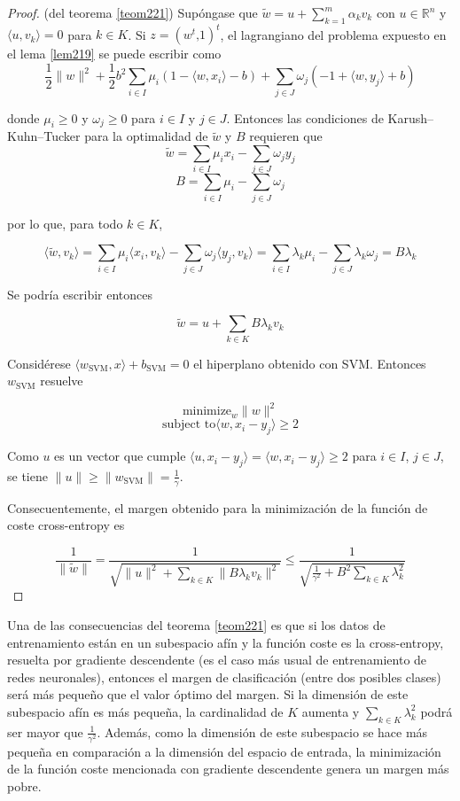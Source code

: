 \begin{proof} (del teorema \ref{teom221})
Supóngase que $\tilde{w} = u + \sum_{k=1}^m \alpha_k v_k$ con $u \in \mathbb{R}^n$ y $\langle u,v_k \rangle=0$ para $k \in K$. Si $z=(w^{t} \text{,} 1 )^{t}$, el lagrangiano del problema expuesto en el lema \ref{lem219} se puede escribir como 
$$\frac{1}{2} \|w \|^2 + \frac{1}{2} b^2 \sum_{i \in I} \mu_i (1- \langle w,x_i \rangle-b) + \sum_{j \in J} \omega_j(-1+ \langle w,y_j \rangle+b)$$

donde $\mu_i \geq 0$ y $\omega_j \geq 0$ para $i \in I$ y $j \in J$. Entonces las condiciones de Karush–Kuhn–Tucker para la optimalidad de $\tilde{w}$ y $B$ requieren que
$$\tilde{w} = \sum_{i \in I} \mu_i x_i - \sum_{j \in J} \omega_j y_j$$
$$B = \sum_{i \in I} \mu_i - \sum_{j \in J} \omega_j$$

por lo que, para todo $k \in K$,

$$\langle \tilde{w},v_k \rangle = \sum_{i \in I} \mu_i \langle x_i,v_k \rangle - \sum_{j \in J} \omega_j \langle y_j,v_k \rangle = \sum_{i \in I} \lambda_k \mu_i - \sum_{j \in J} \lambda_k \omega_j = B \lambda_k$$

Se podría escribir entonces

$$\tilde{w} = u + \sum_{k \in K} B \lambda_k v_k$$

Considérese $\langle w_{\text{SVM}},x \rangle+b_{\text{SVM}}=0$ el hiperplano obtenido con SVM. Entonces $w_{\text{SVM}}$ resuelve

$$\text{minimize}_{w} \|w \|^2$$
$$\text{subject to} \langle w,x_i-y_j \rangle \geq 2$$

Como $u$ es un vector que cumple $\langle u,x_i-y_j \rangle = \langle w,x_i-y_j \rangle \geq 2$ para $i \in I$, $j \in J$, se tiene $\|u \| \geq \|w_{\text{SVM}} \|=\frac{1}{\gamma}$.

Consecuentemente, el margen obtenido para la minimización de la función de coste cross-entropy es

$$\frac{1}{\|\tilde{w} \|} = \frac{1}{\sqrt{\|u \|^2 + \sum_{k \in K} \|B \lambda_k v_k \|^2}} \leq \frac{1}{\sqrt{\frac{1}{\gamma^2}+B^2 \sum_{k \in K} \lambda_k^2}}$$
\end{proof}

Una de las consecuencias del teorema \ref{teom221} es que si los datos de entrenamiento están en un subespacio afín y la función coste es la cross-entropy, resuelta por gradiente descendente (es el caso más usual de entrenamiento de redes neuronales), entonces el margen de clasificación (entre dos posibles clases) será más pequeño que el valor óptimo del margen. Si la dimensión de este subespacio afín es más pequeña, la cardinalidad de $K$ aumenta y $\sum_{k \in K} \lambda_k^2$ podrá ser mayor que $\frac{1}{\gamma^2}$. Además, como la dimensión de este subespacio se hace más pequeña en comparación a la dimensión del espacio de entrada, la minimización de la función coste mencionada con gradiente descendente genera un margen más pobre.

